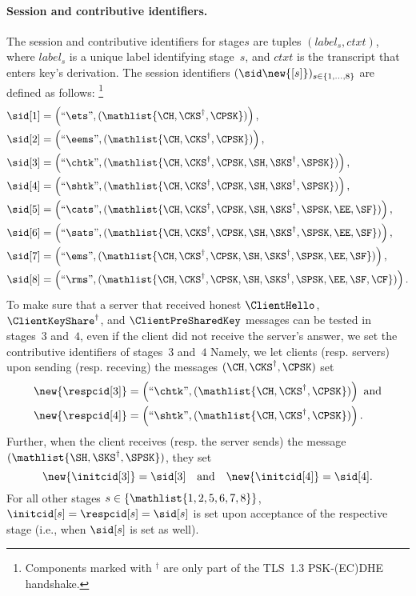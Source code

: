 \paragraph{Session and contributive identifiers.}
The session and contributive identifiers for stage$s$ are tuples $(\mathit{label}_s, \mathit{ctxt})$, where $\mathit{label}_s$ is a unique label identifying stage~$s$, and $\mathit{ctxt}$ is the transcript that enters key's derivation.
The session identifiers $(\sid\new{[s]})_{s \in \{1, \dotsc, 8\}}$ are defined as follows:%
\footnote{Components marked with ${}^\dagger$ are only part of the TLS~1.3 PSK-(EC)DHE handshake.}
%
{\allowdisplaybreaks
\begin{align*}
	\sid[1] &= \left(``\ets", (\mathlist{\CH, \CKS^\dagger, \CPSK}) \right), \\
	\sid[2] &= \left( ``\eems", (\mathlist{\CH, \CKS^\dagger, \CPSK}) \right), \\
	\sid[3] &= \left( ``\chtk", (\mathlist{\CH, \CKS^\dagger, \CPSK, \SH, \SKS^\dagger, \SPSK}) \right), \\
	\sid[4] &= \left( ``\shtk", (\mathlist{\CH, \CKS^\dagger, \CPSK, \SH, \SKS^\dagger, \SPSK}) \right), \\
	\sid[5] &= \left( ``\cats", (\mathlist{\CH, \CKS^\dagger, \CPSK, \SH, \SKS^\dagger, \SPSK, \EE, \SF}) \right), \\
	\sid[6] &= \left( ``\sats", (\mathlist{\CH, \CKS^\dagger, \CPSK, \SH, \SKS^\dagger, \SPSK, \EE, \SF}) \right), \\
	\sid[7] &= \left( ``\ems", (\mathlist{\CH, \CKS^\dagger, \CPSK, \SH, \SKS^\dagger, \SPSK, \EE, \SF}) \right), \\
	\sid[8] &= \left( ``\rms", (\mathlist{\CH, \CKS^\dagger, \CPSK, \SH, \SKS^\dagger, \SPSK, \EE, \SF, \CF}) \right).
\end{align*}}%
%
To make sure that a server that received honest $\ClientHello$, $\ClientKeyShare^\dagger$, and $\ClientPreSharedKey$ messages can be tested in stages~$3$ and~$4$,
even if the client did not receive the server's answer,
we set the contributive identifiers of stages~$3$ and~$4$ 
Namely, we let clients (resp. servers) upon sending (resp. receving) the messages $(\CH, \CKS^\dagger, \CPSK)$ set
\begin{align*}
	\new{\respcid[3]} &= \left( ``\chtk", (\mathlist{\CH, \CKS^\dagger, \CPSK}) \right) \text{ and}\\
	\new{\respcid[4]} &= \left( ``\shtk", (\mathlist{\CH, \CKS^\dagger, \CPSK}) \right).
\end{align*}
Further, when the client receives (resp. the server sends) the message $(\mathlist{\SH, \SKS^\dagger, \SPSK})$, they set 
\[
	\new{\initcid[3]} = \sid[3] \quad\text{and}\quad \new{\initcid[4]} = \sid[4].
\]
For all other stages $s \in \{\mathlist{1,2,5,6,7,8}\}$, $\initcid[s] = \respcid[s] = \sid[s]$ is set upon acceptance of the respective stage (i.e., when $\sid[s]$ is set as well).


